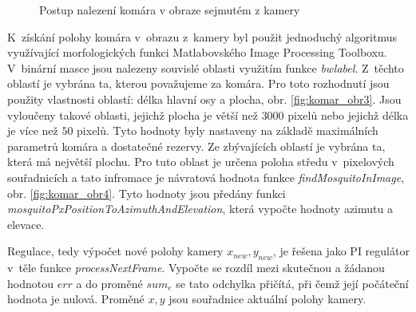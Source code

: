 \documentclass[a4paper,10pt]{article}
\begin{document}
\begin{figure}[!htb]
		    \hfill
		    \caption{Postup nalezení komára v obraze sejmutém z kamery}
		\end{figure}
		
		K~získání polohy komára v~obrazu z~kamery byl použit jednoduchý algoritmus
		využívající morfologických funkci Matlabovského Image Processing Toolboxu. 
		V~binární masce jsou nalezeny souvislé oblasti využitím funkce \textit{bwlabel}.
		Z~těchto oblastí je vybrána ta, kterou považujeme za komára. Pro toto
		rozhodnutí jsou použity vlastnosti oblastí: délka hlavní osy a plocha, obr. \ref{fig:komar_obr3}.
		Jsou vyloučeny takové oblasti, jejichž plocha je větší než $3000$
		pixelů nebo jejichž délka je více než $50$ pixelů. Tyto hodnoty byly nastaveny
		na základě maximálních parametrů komára a dostatečné rezervy. Ze zbývajících
		oblastí je vybrána ta, která má největší plochu. Pro tuto oblast je určena
		poloha středu v~pixelových souřadnicích a tato infromace je návratová hodnota
		funkce \textit{findMosquitoInImage}, obr. \ref{fig:komar_obr4}.
		Tyto hodnoty jsou předány funkci \textit{mosquitoPxPositionToAzimuthAndElevation},
		která vypočte hodnoty azimutu a elevace. 

	        Regulace, tedy výpočet nové polohy kamery $x_{new}, y_{new}$, je řešena jako PI
		regulátor v~těle funkce \textit{processNextFrame}. 
	        Vypočte se rozdíl mezi skutečnou a žádanou hodnotou $err$ a do
		proměné $sum_e$ se tato odchylka přičítá, při čemž její počáteční hodnota je
		nulová. Proměné $x, y$ jsou souřadnice aktuální polohy kamery.
\end{document}
